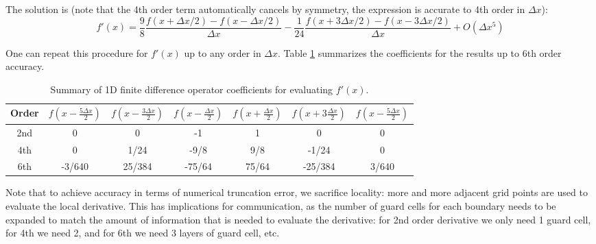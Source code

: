 The solution is (note that the 4th order term automatically cancels by symmetry,
the expression is accurate to 4th order in $\Delta x$):
\begin{equation}
  \label{eq:4th-order-sol}
  f'(x) = \frac{9}{8}\frac{f(x + \Delta x/2) - f(x - \Delta x / 2)}{\Delta x} - \frac{1}{24}\frac{f(x + 3\Delta x / 2) - f(x - 3\Delta x / 2)}{\Delta x} + O(\Delta x^5)
\end{equation}

One can repeat this procedure for $f'(x)$ up to any order in $\Delta x$. Table
\ref{tab:finite-diff} summarizes the coefficients for the results up to 6th
order accuracy.

\begin{table}[h]
  \centering
  \begin{tabular}{ccccccc}
    Order & $f\left(x - \frac{5\Delta x}{2}\right)$ & $f\left(x - \frac{3\Delta x}{2}\right)$ & $f\left(x - \frac{\Delta x}{2}\right)$ & $f\left(x + \frac{\Delta x}{2}\right)$ & $f\left(x + 3\frac{\Delta x}{2}\right)$ & $f\left(x - \frac{5\Delta x}{2}\right)$  \\ \hline
    2nd & 0 & 0 & -1 & 1 & 0 & 0 \\ \hline
    4th & 0 & 1/24 & -9/8 & 9/8 & -1/24 & 0 \\ \hline
    6th & -3/640 & 25/384 & -75/64 & 75/64 & -25/384 & 3/640 \\ \hline
  \end{tabular}
  \caption{Summary of 1D finite difference operator coefficients for evaluating $f'(x)$.}
  \label{tab:finite-diff}
\end{table}

Note that to achieve accuracy in terms of numerical truncation error, we
sacrifice locality: more and more adjacent grid points are used to evaluate the
local derivative. This has implications for communication, as the number of
guard cells for each boundary needs to be expanded to match the amount of
information that is needed to evaluate the derivative: for 2nd order derivative
we only need 1 guard cell, for 4th we need 2, and for 6th we need 3 layers of
guard cell, etc.

